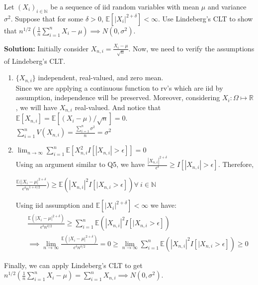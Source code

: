 \documentclass[11pt,letterpaper]{article}                  %
\begin{document}
\bigskip

\begin{problem}
Let $(X_i)_{i \in \mathbb{N}}$ be a sequence of iid random variables with mean $\mu$ and variance $\sigma^2$. Suppose that for some $\delta>0$, $\mathbb{E}\left[|X_i|^{2+\delta}\right]<\infty$. Use Lindeberg's CLT to show that $n^{1/2}(\frac{1}{n}\sum_{i=1}^{n} X_i - \mu) \implies N(0,\sigma^2)$.

\textbf{Solution:}
Initially consider $X_{n,i} = \frac{X_i - \mu}{\sqrt{n}}$. Now, we need to verify the assumptions of Lindeberg's CLT.
\begin{enumerate}
\item $\{X_{n,i}\}$ independent, real-valued, and zero mean. \\
Since we are applying a continuous function to rv's which are iid by assumption, independence will be preserved. Moreover, considering $X_i:\Omega \mapsto \mathbb{R}$, we will have $X_{n,i}$ real-valued. And notice that $\mathbb{E}[X_{n,i}] = \mathbb{E}[(X_i - \mu)/\sqrt{n}] = 0$.\\  $\sum_{i=1}^n V(X_{n,i}) = \frac{\sum_{i=1}^n \sigma^2}{n} = \sigma^2$
\item $\lim_{n \to \infty} \sum_{i=1}^n \mathbb{E}[X_{n,i}^2 I[|X_{n,i}|>\epsilon]] =0$\\
Using an argument similar to Q5, we have $\frac{|X_{n,i}|^{2+\delta}}{\epsilon^{\delta}} \geq I[|X_{n,i}|>\epsilon]$. Therefore,
\begin{center}
$\frac{\mathbb{E}(|X_i - \mu|^{2+\delta}}{\epsilon^{\delta} n^{1+\delta/2}}) \geq \mathbb{E}(|X_{n,i}|^2 I[|X_{n,i}>\epsilon]) \forall \ i \in \mathbb{N}$
\end{center}
Using iid assumption and $\mathbb{E}\left[|X_i|^{2+\delta}\right]<\infty$ we have:
\begin{align*}
&\frac{\mathbb{E}(|X_i-\mu|^{2+\delta})}{\epsilon^{\delta}n^{\delta/2}}\geq \sum_{i=1}^n \mathbb{E}(|X_{n,i}|^2 I[|X_{n,i}>\epsilon])\\
&\implies \lim_{n \to \infty} \frac{\mathbb{E}(|X_i-\mu|^{2+\delta})}{\epsilon^{\delta}n^{\delta/2}} =0 \geq \lim_{n \to \infty} \sum_{i=1}^n \mathbb{E}(|X_{n,i}|^2 I[|X_{n,i}>\epsilon]) \geq 0
\end{align*}
\end{enumerate}
Finally, we can apply Lindeberg's CLT to get $n^{1/2}(\frac{1}{n}\sum_{i=1}^{n} X_i - \mu) = \sum_{i=1}^n X_{n,i} \implies N(0,\sigma^2)$.
\end{problem}
\end{document}
